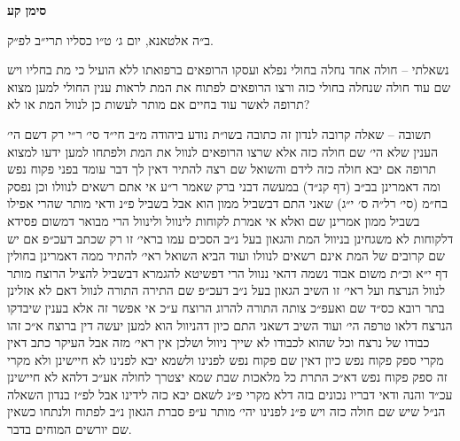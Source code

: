 \documentclass[12pt, openany]{book}
\newcommand{\chapname}{}
\newcommand{\newchap}[1]{
	\addcontentsline{toc}{chapter}{#1}
	\renewcommand{\chapname}{#1}
		\begin{center}
			\textbf{%
\fontsize{16pt}{16pt}\selectfont
				#1}
		\end{center}
}
\begin{document}
\newchap{סימן קע}
\begin{multicols}{2}
ב״ה אלטאנא, יום ג׳ ט״ו כסליו תרי״ב לפ״ק.\\\vspace{0pt}

נשאלתי – חולה אחד נחלה בחולי נפלא ועסקו הרופאים ברפואתו ללא הועיל כי מת בחליו ויש שם עוד חולה שנחלה בחולי כזה ורצו הרופאים לפתוח את המת לראות ענין החולי למען מצוא תרופה לאשר עוד בחיים אם מותר לעשות כן לנוול המת או לא?\\\vspace{0pt}

תשובה – שאלה קרובה לנדון זה כתובה בשו״ת נודע ביהודה מ״ב חי״ד סי׳ ר״י רק דשם הי׳ הענין שלא הי׳ שם חולה כזה אלא שרצו הרופאים לנוול את המת ולפתחו למען ידעו למצוא תרופה אם יבא חולה כזה לידם והשואל שם רצה להתיר דאין לך דבר עומד בפני פקוח נפש ומה דאמרינן בב״ב (דף קנ״ד) במעשה דבני ברק שאמר ר״ע אי אתם רשאים לנוולו וכן נפסק בח״מ (סי׳ רל״ה ס׳ י״ג) שאני התם דבשביל ממון הוא אבל בשביל פ״נ ודאי מותר שהרי אפילו בשביל ממון אמרינן שם ואלא אי אמרת לקוחות לינוול ולינוול הרי מבואר דמשום פסידא דלקוחות לא משגחינן בניוול המת והגאון בעל נ״ב הסכים עמו בראי׳ זו רק שכתב דעכ״פ אם יש שם קרובים של המת אינם רשאים לנוולו ועוד הביא השואל ראי׳ להתיר ממה דאמרינן בחולין דף י״א וכ״ת משום אבוד נשמה דהאי ננוול הרי דפשיטא להגמרא דבשביל להציל הרוצח מותר לנוול הנרצח ועל ראי׳ זו השיב הגאון בעל נ״ב דעכ״פ שם התירה התורה לנוול דאם לא אזלינן בתר רובא כס״ד שם ואעפ״כ צותה התורה להרוג הרוצח ע״כ אי אפשר זה אלא בענין שיבדקו הנרצח דלאו טרפה הי׳ ועוד השיב דשאני התם כיון דהניוול הוא למען יעשה דין ברוצח א״כ זהו כבודו של נרצח וכל שהוא לכבודו לא שייך ניוול ושלכן אין ראי׳ מזה אבל העיקר כתב דאין מקרי ספק פקוח נפש כיון דאין שם פקוח נפש לפנינו ולשמא יבא לפנינו לא חיישינן ולא מקרי זה ספק פקוח נפש דא״כ התרת כל מלאכות שבת שמא יצטרך לחולה אע״כ דלהא לא חיישינן עכ״ד והנה ודאי דבריו נכונים בזה דלא מקרי פ״נ לשאם יבא כזה לידינו אבל לפ״ז בנדון השאלה הנ״ל שיש שם חולה כזה ויש פ״נ לפנינו יהי׳ מותר ע״פ סברת הגאון נ״ב לפתוח ולנתחו כשאין שם יורשים המוחים בדבר.\\\vspace{0pt}


\end{multicols}
\end{document}
